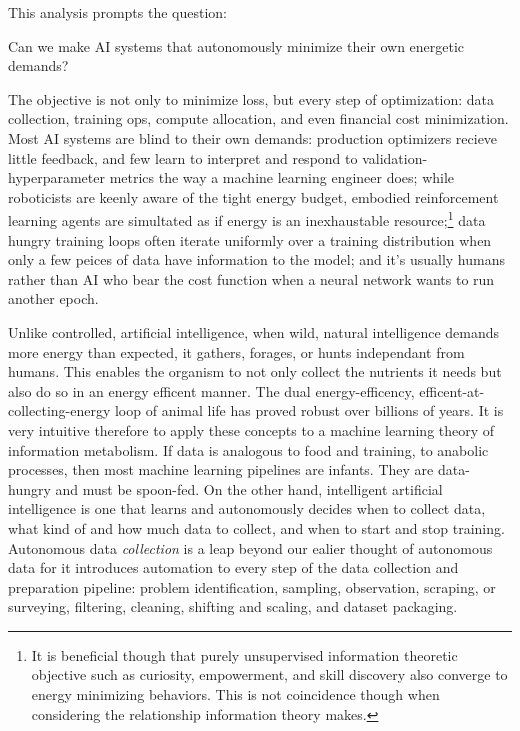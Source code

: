 This analysis prompts the question:

\begin{center}
Can we make AI systems that autonomously minimize their own energetic demands?
\end{center}

The objective is not only to minimize loss, but every step of optimization: data collection, training ops, compute allocation, and even financial cost minimization. Most AI systems are blind to their own demands: production optimizers recieve little feedback, and few learn to interpret and respond to validation-hyperparameter metrics the way a machine learning engineer does; while roboticists are keenly aware of the tight energy budget, embodied reinforcement learning agents are simultated as if energy is an inexhaustable resource;\footnote{It is beneficial though that purely unsupervised information theoretic objective such as curiosity, empowerment, and skill discovery also converge to energy minimizing behaviors. This is not coincidence though when considering the relationship information theory makes.} data hungry training loops often iterate uniformly over a training distribution when only a few peices of data have information to the model; and it's usually humans rather than AI who bear the cost function when a neural network wants to run another epoch. 

Unlike controlled, artificial intelligence, when wild, natural intelligence demands more energy than expected, it gathers, forages, or hunts independant from humans. This enables the organism to not only collect the nutrients it needs but also do so in an energy efficent manner. The dual energy-efficency, efficent-at-collecting-energy loop of animal life has proved robust over billions of years. It is very intuitive therefore to apply these concepts to a machine learning theory of information metabolism. If data is analogous to food and training, to anabolic processes, then most machine learning pipelines are infants. They are data-hungry and must be spoon-fed. On the other hand, intelligent artificial intelligence is one that learns and autonomously decides when to collect data, what kind of and how much data to collect, and when to start and stop training. Autonomous data \textit{collection} is a leap beyond our ealier thought of autonomous data  for it introduces automation to every step of the data collection and preparation pipeline: problem identification, sampling, observation, scraping, or surveying, filtering, cleaning, shifting and scaling, and dataset packaging.


